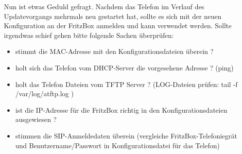 \documentclass[a4paper,12pt]{scrbook}
\begin{document}
Nun ist etwas Geduld gefragt. Nachdem das Telefon im Verlauf des Updatevorgangs mehrmals neu gestartet hat, sollte es sich mit der neuen Konfiguration an der FritzBox anmelden und kann 
verwendet werden. Sollte irgendwas schief gehen bitte folgende Sachen überprüfen:

\begin{itemize}
 \item stimmt die MAC-Adresse mit den Konfigurationsdateien überein ?
 \item holt sich das Telefon vom DHCP-Server die vorgesehene Adresse ? (ping)
 \item holt das Telefon Dateien vom TFTP Server ? (LOG-Dateien prüfen: tail -f /var/log/atftp.log )
 \item ist die IP-Adresse für die FritzBox richtig in den Konfigurationsdateien ausgewiesen ?
 \item stimmen die SIP-Anmeldedaten überein (vergleiche FritzBox-Telefoniegrät und Benutzername/Passwort in Konfigurationsdatei für das Telefon) 
\end{itemize}
\end{document}
